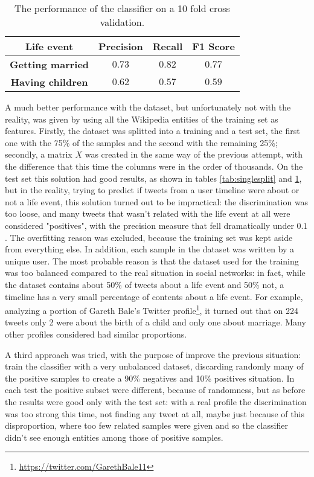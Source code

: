 \begin{table}
\begin{center}
\begin{tabular}{cccc}
\hline
Life event & Precision & Recall & F1 Score \\
\hline
\textbf{Getting married} & $0.73$ & $0.82$ & $0.77$ \\
\textbf{Having children} & $0.62$ & $0.57$ & $0.59$ \\
\hline
\end{tabular}
\end{center}
\caption{The performance of the classifier on a 10 fold cross validation.}
\label{tab:kfold}
\end{table}

A much better performance with the dataset, but unfortunately not with the reality, was given by using all the Wikipedia entities of the training set as features. Firstly, the dataset was splitted into a training and a test set, the first one with the 75\% of the samples and the second with the remaining 25\%; secondly, a matrix $X$ was created in the same way of the previous attempt, with the difference that this time the columns were in the order of thousands. On the test set this solution had good results, as shown in tables \ref{tab:singlesplit} and \ref{tab:kfold}, but in the reality, trying to predict if tweets from a user timeline were about or not a life event, this solution turned out to be impractical: the discrimination was too loose, and many tweets that wasn't related with the life event at all were considered "positives", with the precision measure that fell dramatically under $0.1$. The overfitting reason was excluded, because the training set was kept aside from everything else. In addition, each sample in the dataset was written by a unique user. The most probable reason is that the dataset used for the training was too balanced compared to the real situation in social networks: in fact, while the dataset contains about 50\% of tweets about a life event and 50\% not, a timeline has a very small percentage of contents about a life event. For example, analyzing a portion of Gareth Bale's Twitter profile\footnote{\url{https://twitter.com/GarethBale11}}, it turned out that on 224 tweets only 2 were about the birth of a child and only one about marriage. Many other profiles considered had similar proportions. 

A third approach was tried, with the purpose of improve the previous situation: train the classifier with a very unbalanced dataset, discarding randomly many of the positive samples to create a 90\% negatives and 10\% positives situation. In each test the positive subset were different, because of randomness, but as before the results were good only with the test set: with a real profile the discrimination was too strong this time, not finding any tweet at all, maybe just because of this disproportion, where too few related samples were given and so the classifier didn't see enough entities among those of positive samples.